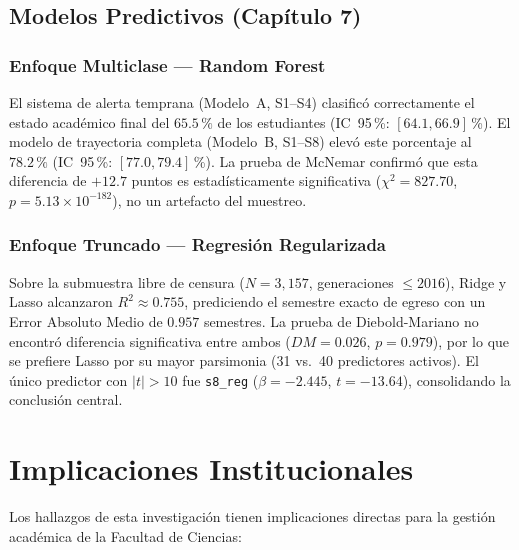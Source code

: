 \subsection{Modelos Predictivos (Capítulo 7)}

\subsubsection{Enfoque Multiclase — Random Forest}

El sistema de alerta temprana (Modelo~A, S1--S4) clasificó correctamente el estado académico
final del $65.5\,\%$ de los estudiantes (IC~95\,\%: $[64.1, 66.9]$\,\%). El modelo de
trayectoria completa (Modelo~B, S1--S8) elevó este porcentaje al $78.2\,\%$
(IC~95\,\%: $[77.0, 79.4]$\,\%). La prueba de McNemar confirmó que esta diferencia de
$+12.7$ puntos es estadísticamente significativa ($\chi^2 = 827.70$,
$p = 5.13 \times 10^{-182}$), no un artefacto del muestreo.

\subsubsection{Enfoque Truncado — Regresión Regularizada}

Sobre la submuestra libre de censura ($N = 3{,}157$, generaciones $\leq 2016$), Ridge y Lasso
alcanzaron $R^2 \approx 0.755$, prediciendo el semestre exacto de egreso con un Error Absoluto
Medio de $0.957$ semestres. La prueba de Diebold-Mariano no encontró diferencia significativa
entre ambos ($DM = 0.026$, $p = 0.979$), por lo que se prefiere Lasso por su mayor parsimonia
(31 vs.\ 40 predictores activos). El único predictor con $|t| > 10$ fue \texttt{s8\_reg}
($\beta = -2.445$, $t = -13.64$), consolidando la conclusión central.

\section{Implicaciones Institucionales}

Los hallazgos de esta investigación tienen implicaciones directas para la gestión académica
de la Facultad de Ciencias:

